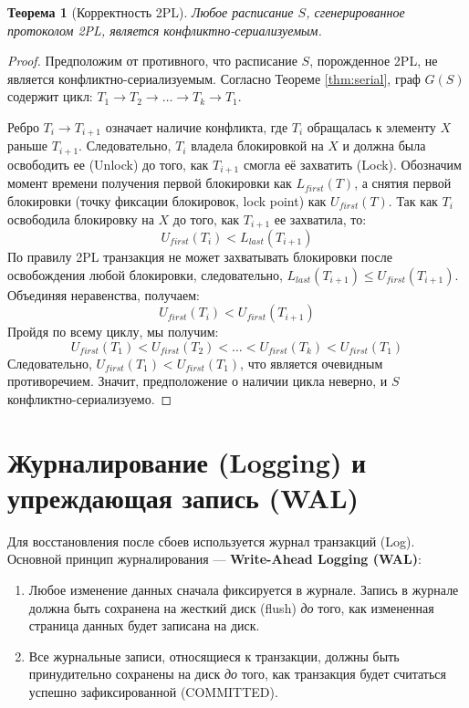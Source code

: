 \documentclass[a4paper,12pt]{article}
\newtheorem{theorem}{Теорема}
\begin{document}
\begin{theorem}[Корректность 2PL]
Любое расписание $S$, сгенерированное протоколом 2PL, является конфликтно-сериализуемым.
\end{theorem}

\begin{proof}
Предположим от противного, что расписание $S$, порожденное 2PL, не является конфликтно-сериализуемым. Согласно Теореме \ref{thm:serial}, граф $G(S)$ содержит цикл: $T_1 \to T_2 \to \dots \to T_k \to T_1$.

Ребро $T_i \to T_{i+1}$ означает наличие конфликта, где $T_i$ обращалась к элементу $X$ раньше $T_{i+1}$. Следовательно, $T_i$ владела блокировкой на $X$ и должна была освободить ее (Unlock) до того, как $T_{i+1}$ смогла её захватить (Lock). Обозначим момент времени получения первой блокировки как $L_{first}(T)$, а снятия первой блокировки (точку фиксации блокировок, lock point) как $U_{first}(T)$.
Так как $T_i$ освободила блокировку на $X$ до того, как $T_{i+1}$ ее захватила, то:
$$ U_{first}(T_i) < L_{last}(T_{i+1}) $$
По правилу 2PL транзакция не может захватывать блокировки после освобождения любой блокировки, следовательно, $L_{last}(T_{i+1}) \le U_{first}(T_{i+1})$. Объединяя неравенства, получаем:
$$ U_{first}(T_i) < U_{first}(T_{i+1}) $$
Пройдя по всему циклу, мы получим:
$$ U_{first}(T_1) < U_{first}(T_2) < \dots < U_{first}(T_k) < U_{first}(T_1) $$
Следовательно, $U_{first}(T_1) < U_{first}(T_1)$, что является очевидным противоречием. Значит, предположение о наличии цикла неверно, и $S$ конфликтно-сериализуемо.
\end{proof}


\section{Журналирование (Logging) и упреждающая запись (WAL)}

Для восстановления после сбоев используется журнал транзакций (Log).
Основной принцип журналирования — \textbf{Write-Ahead Logging (WAL)}:
\begin{enumerate}
    \item Любое изменение данных сначала фиксируется в журнале. Запись в журнале должна быть сохранена на жесткий диск (flush) \textit{до} того, как измененная страница данных будет записана на диск.
    \item Все журнальные записи, относящиеся к транзакции, должны быть принудительно сохранены на диск \textit{до} того, как транзакция будет считаться успешно зафиксированной (COMMITTED).
\end{enumerate}
\end{document}
